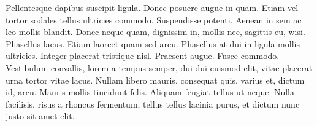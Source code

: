 Pellentesque dapibus suscipit ligula. Donec posuere augue in quam. Etiam vel
tortor sodales tellus ultricies commodo. Suspendisse potenti. Aenean in sem ac
leo mollis blandit. Donec neque quam, dignissim in, mollis nec, sagittis eu,
wisi. Phasellus lacus. Etiam laoreet quam sed arcu. Phasellus at dui in ligula
mollis ultricies. Integer placerat tristique nisl. Praesent augue. Fusce
commodo. Vestibulum convallis, lorem a tempus semper, dui dui euismod elit,
vitae placerat urna tortor vitae lacus. Nullam libero mauris, consequat quis,
varius et, dictum id, arcu. Mauris mollis tincidunt felis. Aliquam feugiat
tellus ut neque. Nulla facilisis, risus a rhoncus fermentum, tellus tellus
lacinia purus, et dictum nunc justo sit amet elit.
